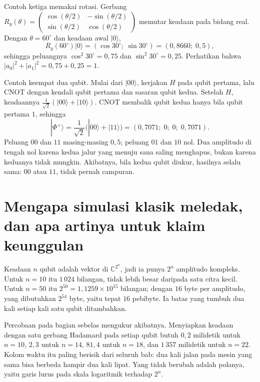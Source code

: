 Contoh ketiga memakai rotasi. Gerbang
$R_y(\theta)=\begin{pmatrix}\cos(\theta/2)&-\sin(\theta/2)\\
\sin(\theta/2)&\cos(\theta/2)\end{pmatrix}$ memutar keadaan pada bidang real. Dengan
$\theta=60^\circ$ dan keadaan awal $|0\rangle$,
\[
R_y(60^\circ)|0\rangle=(\cos 30^\circ;\;\sin 30^\circ)=(0{,}8660;\;0{,}5),
\]
sehingga peluangnya $\cos^{2}30^\circ=0{,}75$ dan $\sin^{2}30^\circ=0{,}25$. Perhatikan
bahwa $|a_0|^2+|a_1|^2=0{,}75+0{,}25=1$.

Contoh keempat dua qubit. Mulai dari $|00\rangle$, kerjakan $H$ pada qubit pertama, lalu
CNOT dengan kendali qubit pertama dan sasaran qubit kedua. Setelah $H$, keadaannya
$\frac{1}{\sqrt{2}}(|00\rangle+|10\rangle)$. CNOT membalik qubit kedua hanya bila qubit
pertama $1$, sehingga
\[
|\Phi^{+}\rangle=\frac{1}{\sqrt{2}}\bigl(|00\rangle+|11\rangle\bigr)
=(0{,}7071;\;0;\;0;\;0{,}7071).
\]
Peluang $00$ dan $11$ masing-masing $0{,}5$; peluang $01$ dan $10$ nol. Dua amplitudo di
tengah nol karena kedua jalur yang menuju sana saling menghapus, bukan karena keduanya
tidak mungkin. Akibatnya, bila kedua qubit diukur, hasilnya selalu sama: $00$ atau
$11$, tidak pernah campuran.


\section{Mengapa simulasi klasik meledak, dan apa artinya untuk klaim keunggulan}

Keadaan $n$ qubit adalah vektor di $\mathbb{C}^{2^{n}}$, jadi ia punya $2^{n}$ amplitudo
kompleks. Untuk $n=10$ itu $1\,024$ bilangan, tidak lebih besar daripada satu citra
kecil. Untuk $n=50$ itu $2^{50}=1{,}1259\times10^{15}$ bilangan; dengan $16$ byte per
amplitudo, yang dibutuhkan $2^{54}$ byte, yaitu tepat $16$ pebibyte. Ia batas yang
tumbuh dua kali setiap kali satu qubit ditambahkan.

Percobaan pada bagian sebelas mengukur akibatnya. Menyiapkan keadaan dengan satu gerbang
Hadamard pada setiap qubit butuh $0{,}2$ milidetik untuk $n=10$, $2{,}3$ untuk $n=14$,
$81{,}4$ untuk $n=18$, dan $1\,357$ milidetik untuk $n=22$. Kolom waktu itu paling
berisik dari seluruh bab: dua kali jalan pada mesin yang sama bisa berbeda hampir dua
kali lipat. Yang tidak berubah adalah polanya, yaitu garis lurus pada skala logaritmik
terhadap $2^{n}$.

